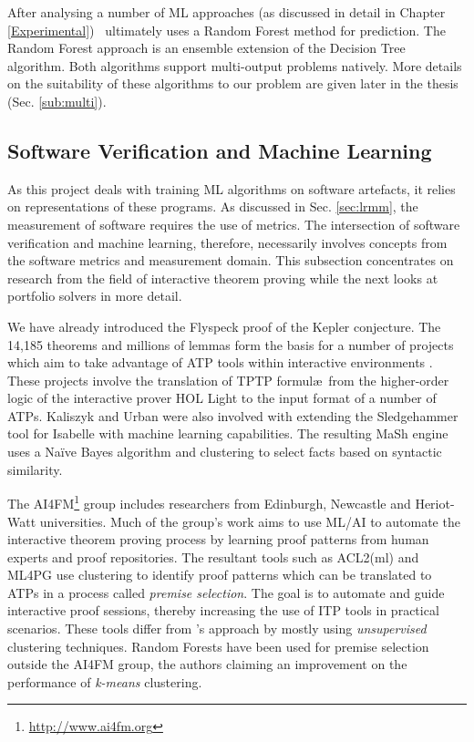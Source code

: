After analysing a number of ML approaches (as discussed in detail in Chapter \ref{Experimental}) \where~ultimately uses a Random Forest \cite{RandomForests} method for prediction. The Random Forest approach is an ensemble extension of the Decision Tree \cite{DecisionTrees} algorithm. Both algorithms support multi-output problems natively. More details on the suitability of these algorithms to our problem are given later in the thesis (Sec. \ref{sub:multi}). 


\subsection{Software Verification and Machine Learning}
\label{sub:lrsvml}

As this project deals with training ML algorithms on software artefacts, it relies on representations of these programs. As discussed in Sec. \ref{sec:lrmm}, the measurement of software requires the use of metrics. The intersection of software verification and machine learning, therefore, necessarily involves concepts from the software metrics and measurement domain. This subsection concentrates on research from the field of interactive theorem proving while the next looks at portfolio solvers in more detail.

We have already introduced the Flyspeck \cite{hales-kepler} proof of the Kepler conjecture. The 14,185 theorems and millions of lemmas form the basis for a number of projects which aim to take advantage of ATP tools within interactive environments \cite{Flyspec, Kaliszyk2015109}. These projects involve the translation of TPTP formul\ae~from the higher-order logic of the  interactive prover \textsf{HOL Light} to the input format of a number of ATPs. Kaliszyk and Urban were also involved with extending the Sledgehammer \cite{threeyears} tool for Isabelle \cite{Isabelle} with machine learning capabilities. The resulting MaSh \cite{Sledgehammer} engine uses a Na{\"i}ve Bayes algorithm and clustering to select facts based on syntactic similarity.       

The AI4FM\footnote{\url{http://www.ai4fm.org}} group includes researchers from Edinburgh, Newcastle and Heriot-Watt universities. Much of the group's work \cite{Heras2013, ML4PG, bundy_et_al:DR:2012:3731} aims to use ML/AI to automate the interactive theorem proving process by learning proof patterns from human experts and proof repositories. The resultant tools such as ACL2(ml) \cite{Heras2013} and ML4PG \cite{ML4PG} use clustering to identify proof patterns which can be translated to ATPs in a process called \textit{premise selection}. The goal is to automate and guide interactive proof sessions, thereby increasing the use of ITP tools in practical scenarios. These tools differ from \where's approach by mostly using \textit{unsupervised} clustering techniques. Random Forests have been used for premise selection \cite{Farber2015} outside the AI4FM group, the authors claiming an improvement on the performance of \textit{k-means} clustering. 

